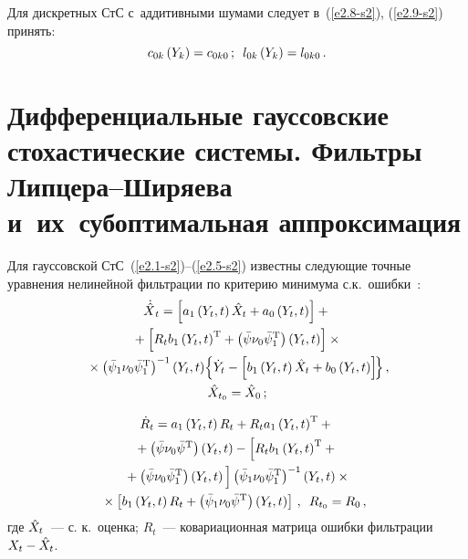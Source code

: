 \begin{multicols}{2}
Для дискретных СтС с~аддитивными шумами следует в~(\ref{e2.8-s2}), (\ref{e2.9-s2}) принять:
\begin{equation*}
c_{0k} \left(Y_k\right) = c_{0k0}\,; \enskip l_{0k} \left(Y_k\right) = l_{0k0}\,.
\end{equation*}

\section{Дифференциальные гауссовские стохастические системы. 
Фильтры Липцера--Ширяева и~их~субоптимальная аппроксимация}

Для гауссовской СтС~(\ref{e2.1-s2})--(\ref{e2.5-s2})  
известны следу\-ющие точные уравнения нелинейной фильтрации по критерию минимума с.к.\ 
ошибки~\cite{2-s2, 3-s2}:
\begin{multline}
{\dot{\hat X}}_t= \left[a_1 \left(Y_t,t\right) \hat X_t + a_0 \left(Y_t,t\right)\right] +{}\\
{}+ \left[R_tb_1 \left(Y_t,t\right)^{\mathrm{T}} +
\left(\bar \psi\nu_0\bar \psi_1^{\mathrm{T}}\right)
    \left(Y_t,t\right)\right]\times{}\\
{}\times \left(\bar \psi_1\nu_0\bar \psi_1^{\mathrm{T}}\right)^{-1} \left(Y_t,t\right) 
\!\left\{ \dot Y_t -\left[ b_1\left(Y_t,t\right) \hat X_t +b_0\left(Y_t,t\right)\right] 
\!\right\},\hspace*{-0.84221pt}\\ 
    \hat X_{t_0} = \hat X_0\,;\label{e3.1-s2}
    \end{multline}
    
    
    \noindent
\begin{multline}
\dot R_t =  a_1\left(Y_t,t\right) R_t + R_t a_1 
\left(Y_t,t\right)^{\mathrm{T}} +{}\\
{}+\left(\bar \psi\nu_0\bar \psi^{\mathrm{T}}\right) 
\left(Y_t,t\right) -
    \left[ R_t b_1 \left(Y_t,t\right)^{\mathrm{T}}+{}\right.\\
\left.{}+\left(\bar \psi\nu_0\bar \psi_1^{\mathrm{T}}\right) \left(Y_t,t\right)
\vphantom{\left(Y_t,t\right)^{\mathrm{T}}}
\right] 
\left(\bar\psi_1\nu_0\bar\psi_1^{\mathrm{T}}\right)^{-1} \left(Y_t,t\right) \times{}\\
\!\!\!\!{}\times
\left[ b_1 \left(Y_t,t\right) R_t+ \left(\bar \psi_1 \nu_0 \bar \psi^{\mathrm{T}}\right)
    \left(Y_t,t\right)\right]\,,\enskip R_{t_0} = R_0\,,
\!    \label{e3.2-s2}
    \end{multline}
где $\hat X_t$~--- с. к.\ оценка; $R_t$~--- ковариационная матрица ошибки 
фильтрации $X_t\hm- \hx_t$.


\end{multicols}

